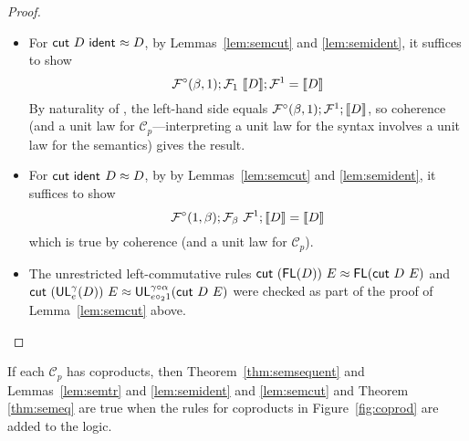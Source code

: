 \documentclass{drl-common/llncs}
\renewcommand{\sem}[1]{\ensuremath{ \llbracket #1 \rrbracket}}
\newcommand{\C}{\ensuremath{\mathcal{C}}}
\newcommand\compo[2]{\ensuremath{#1 \circ #2}}
\newcommand\comph[2]{\ensuremath{#1 \mathbin{\circ_2} #2}}
\newcommand\ident[1]{\ensuremath{\dsd{ident}_{#1}}}
\newcommand\cutsym{\ensuremath{\dsd{cut}}}
\newcommand\cut[2]{\ensuremath{{\cutsym \,\, #1 \,\, #2}}}
\newcommand\UL[3]{\ensuremath{\dsd{UL}^{#1}_{#2}(#3)}}
\newcommand\FL[1]{\ensuremath{\dsd{FL}(#1)}}
\newcommand\ap[2]{\ensuremath{#1 \approx #2}}
\begin{document}
\begin{proof}
\begin{itemize}
\item For  
{\ap{\cut{D}{\ident{}}}{D}},
by Lemmas~\ref{lem:semcut} and \ref{lem:semident}, 
it suffices to show 
\[
\semFcomp(\beta,1);\semF{1}{\sem{D}};\semFone = \sem{D}
\]
By naturality of \semFone, the left-hand side equals
$\semFcomp(\beta,1);\semFone;\sem{D}$, so coherence (and a unit law for
$\C_p$---interpreting a unit law for the syntax involves a unit law for
the semantics) gives the result.

\item For {\ap{\cut{\ident{}}{D}}{D}}, by 
by Lemmas~\ref{lem:semcut} and \ref{lem:semident}, 
it suffices to show 
\[
\semFcomp(1,\beta);\semF{\beta}{\semFone};{\sem{D}} = \sem{D}
\]
which is true by coherence (and a unit law for $\C_p$).

\item The unrestricted left-commutative rules ${\ap{\cut {(\FL D)} E} {\FL {\cut D E}}}$
and\\ ${\ap{\cut {(\UL \gamma e D)} E} {\UL {\compo{\gamma}{\alpha}}
    {\comph{e}{1}} {\cut D E}}}$ were checked as part of the proof of
Lemma~\ref{lem:semcut} above.   
\end{itemize}
\end{proof}

\begin{lemma} \label{lem:coproductinterp}
If each $\C_p$ has coproducts, then
Theorem~\ref{thm:semsequent} and Lemmas~\ref{lem:semtr} and
\ref{lem:semident} and \ref{lem:semcut} and Theorem \ref{thm:semeq} are
true when the rules for coproducts in Figure~\ref{fig:coprod} are added
to the logic.  
\end{lemma}
\end{document}
